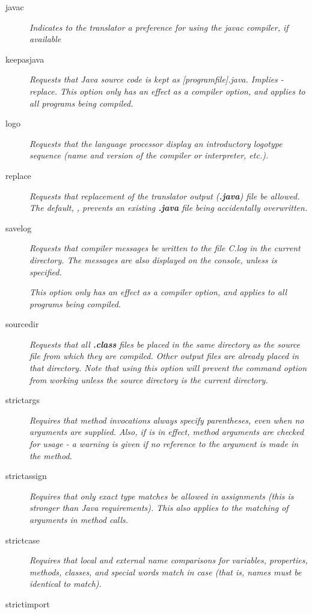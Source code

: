 \begin{description}
\item[javac]
\emph{Indicates to the translator a preference for using the
  \emph{javac} compiler, if available}

\item[keepasjava]
\emph{Requests that Java source code is kept as
  [programfile].java. Implies -replace. This option only has an effect
  as a compiler option, and applies to all programs being compiled.}

\item[logo]
\emph{Requests that the language processor display an introductory
logotype sequence (name and version of the compiler or interpreter,
\emph{etc.}).}
\item[replace]
\emph{Requests that replacement of the translator output
(\textbf{.java}) file be allowed.
The default, , prevents an existing \textbf{.java}
file being accidentally overwritten.}
\item[savelog]

\emph{Requests that compiler messages be written to the file \nr{}C.log in
the current directory.
The messages are also displayed on the console, unless
 is specified.}
 
\emph{This option only has an effect as a compiler option, and applies to all
programs being compiled.}
\item[sourcedir]

\emph{Requests that all \textbf{.class} files be placed in the same
directory as the source file from which they are compiled.  Other output
files are already placed in that directory.
Note that using this option will prevent the  command
option from working unless the source directory is the current
directory.}
\item[strictargs]

\emph{Requires that method invocations always specify parentheses, even
when no arguments are supplied.  Also, if  is in
effect, method arguments are checked for usage - a warning is given
if no reference to the argument is made in the method.}
\item[strictassign]
\emph{Requires that only exact type matches be allowed in assignments
(this is stronger than Java requirements).
This also applies to the matching of arguments in method calls.}
\item[strictcase]
\emph{Requires that local and external name comparisons for variables,
properties, methods, classes, and special words match in case (that is,
names must be identical to match).}
\item[strictimport]


\end{description}
